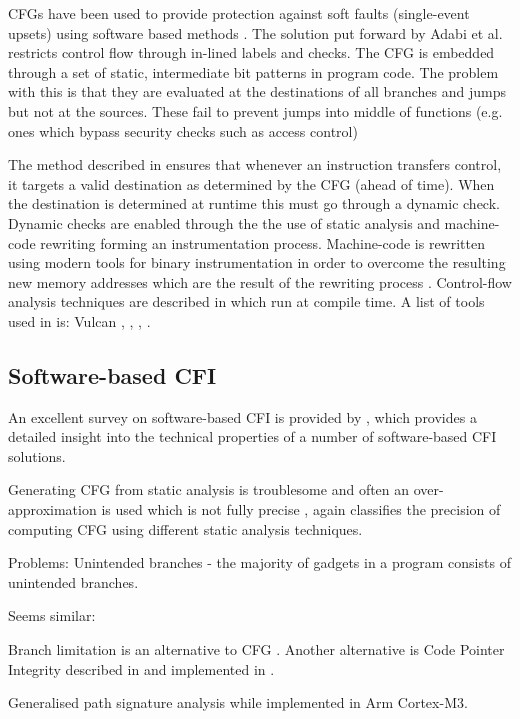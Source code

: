 CFGs have been used to provide protection against soft faults (single-event upsets) using software based methods \cite{Oh2002} \cite{Sharma2012} \cite{Venkatasubramanian2003}. 
The solution put forward by Adabi et al. \cite{Abadi2005} restricts control flow through in-lined labels and checks. The CFG is embedded through a set of static, intermediate bit patterns in program code. The problem with this is that they are evaluated at the destinations of all branches and jumps but not at the sources. These fail to prevent jumps into middle of functions (e.g. ones which bypass security checks such as access control)

The method described in \cite{Abadi2005} ensures that whenever an instruction transfers control, it targets a valid destination as determined by the CFG (ahead of time). When the destination is determined at runtime this must go through a dynamic check. Dynamic checks are enabled through the the use of static analysis and machine-code rewriting forming an instrumentation process. Machine-code is rewritten using modern tools for binary instrumentation in order to overcome the resulting new memory addresses which are the result of the rewriting process\cite{Edwards2001} \cite{Srivastava1994}. Control-flow analysis techniques are described in \cite{AhoAlfredV.2014C:pt} \cite{Atkinson} \cite{Wagner2002} which run at compile time. A list of tools used in \cite{Abadi2005} is: Vulcan \cite{Edwards2001}, \cite{AhoAlfredV.2014C:pt}, \cite{Feng2003} \cite{Gopalakrishna2005}, \cite{Wagner2002}.

\subsection{Software-based CFI}

An excellent survey on software-based CFI is provided by \cite{Burow}, which provides a detailed insight into the technical properties of a number of software-based CFI solutions.

Generating CFG from static analysis is troublesome and often an over-approximation is used which is not fully precise \cite{Carlini2015} \cite{Kinder2012}, again \cite{Burow} classifies the precision of computing CFG using different static analysis techniques.

Problems: Unintended branches \cite{Kayaalp2014} - the majority of gadgets in a program consists of unintended branches. 

Seems similar: \cite{Mao2010}

Branch limitation is an alternative to CFG \cite{He2017} \cite{Corporation2017}.
Another alternative is Code Pointer Integrity described in \cite{Security2017} and implemented in \cite{Kuznetsov:204783} \cite{Mashtizadeh2014} \cite{Szekeres2013}.

Generalised path signature analysis \cite{Mahmood1988} while \cite{Werner2016} implemented in Arm Cortex-M3.
 